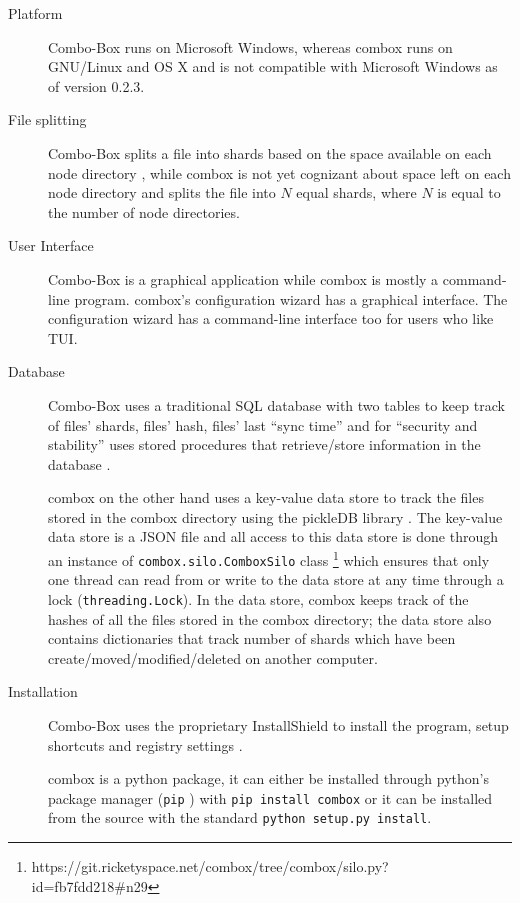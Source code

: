 \begin{description}
\item[Platform] Combo-Box runs on Microsoft Windows, whereas combox
  runs on GNU/Linux and OS X and is not compatible with Microsoft
  Windows as of version 0.2.3.
\item[File splitting] Combo-Box splits a file into shards based on the
  space available on each node directory \cite{vollmar-combo-box},
  while combox is not yet cognizant about space left on each node
  directory and splits the file into $N$ equal shards, where $N$ is
  equal to the number of node directories.
\item[User Interface] Combo-Box is a graphical application while
  combox is mostly a command-line program. combox's configuration
  wizard has a graphical interface. The configuration wizard has a
  command-line interface too for users who like TUI.
\item[Database] Combo-Box uses a traditional SQL database with two
  tables to keep track of files' shards, files' hash, files' last
  ``sync time'' and for ``security and stability'' uses stored
  procedures that retrieve/store information in the database
  \cite{vollmar-combo-box}.

  combox on the other hand uses a key-value data store to track the
  files stored in the combox directory using the pickleDB library
  \cite{pylib:pickledb}. The key-value data store is a JSON file and
  all access to this data store is done through an instance of
  \verb+combox.silo.ComboxSilo+ class
  \footnote{https://git.ricketyspace.net/combox/tree/combox/silo.py?id=fb7fdd218\#n29}
  which ensures that only one thread can read from or write to the
  data store at any time through a lock (\verb+threading.Lock+). In
  the data store, combox keeps track of the hashes of all the files
  stored in the combox directory; the data store also contains
  dictionaries that track number of shards which have been
  create/moved/modified/deleted on another computer.

\item[Installation] Combo-Box uses the proprietary InstallShield
  \cite{nonfree-installshield} to install the program, setup shortcuts
  and registry settings \cite{vollmar-combo-box}.

  combox is a python package, it can either be installed through
  python's package manager (\verb+pip+ \cite{py:pip}) with
  \verb+pip install combox+ or it can be installed from the source
  with the standard \verb+python setup.py install+.


\end{description}
